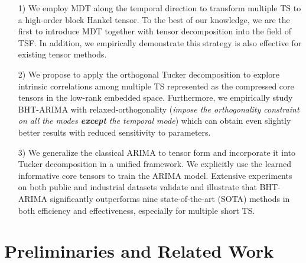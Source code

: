 \documentclass[letterpaper]{article} %
\numberwithin{theorem}{section}
\begin{document}
	
	\begin{enumerate}
		\item [1)]  We  employ  MDT along the temporal direction to transform  multiple TS to a high-order block Hankel tensor.  To the best of our knowledge, we are the first  to introduce MDT together with tensor decomposition into  the field of TSF. In addition, we empirically demonstrate this strategy is also  effective for existing  tensor  methods. 
		\item  [2)]   We propose to apply the  orthogonal  Tucker decomposition   to explore  intrinsic   correlations among  multiple TS  represented as the compressed core tensors     in the low-rank embedded  space.  Furthermore, we empirically study  BHT-ARIMA with relaxed-orthogonality (\textit{impose the   orthogonality  constraint  on all the modes  \textbf{except}    the  temporal mode}) which can obtain even slightly better  results with reduced sensitivity to  parameters.  
		\item [3)]  We generalize the classical  ARIMA to tensor form and  incorporate it into   Tucker decomposition in a unified framework. We explicitly use the learned informative core tensors  to train the ARIMA model. Extensive experiments  on both public and industrial datasets validate and illustrate    that BHT-ARIMA significantly outperforms nine state-of-the-art (SOTA) methods in both efficiency and effectiveness, especially for multiple short TS.
	\end{enumerate}





\section {Preliminaries and Related Work}
\end{document}
